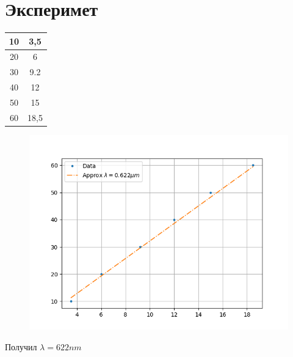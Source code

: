 
\section{Эксперимет}

\begin{center}
    \begin{tabular}{c | c}
        10 & 3,5 \\
        \hline 
        20 & 6 \\
        \hline
        30 & 9.2 \\
        \hline
        40 & 12 \\
        \hline
        50 & 15 \\ 
        \hline
        60 & 18,5        
    \end{tabular}
\end{center}

\begin{figure}[h]
    \centering
    \includegraphics[trim={0 0 0 0},clip,width=\textwidth]{Ex_1/approx.png}
    \caption{}
    \label{Task_1_1}
\end{figure}

Получил $\lambda = 622 nm$


